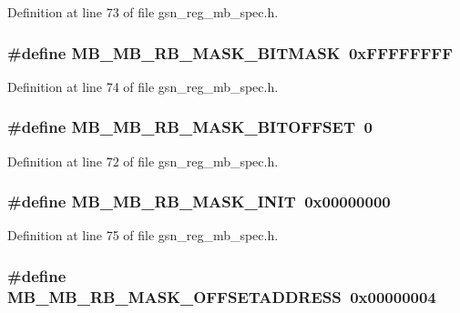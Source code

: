 Definition at line 73 of file gsn\_\-reg\_\-mb\_\-spec.h.

\hypertarget{a00562_a0c02b645113d43765676d4c2852d9c7c}{
\subsubsection[{MB\_\-MB\_\-RB\_\-MASK\_\-BITMASK}]{\setlength{\rightskip}{0pt plus 5cm}\#define MB\_\-MB\_\-RB\_\-MASK\_\-BITMASK~0xFFFFFFFF}}
\label{a00562_a0c02b645113d43765676d4c2852d9c7c}


Definition at line 74 of file gsn\_\-reg\_\-mb\_\-spec.h.

\hypertarget{a00562_adc962ec4ed6e07508c4bb1bf9e56a932}{
\subsubsection[{MB\_\-MB\_\-RB\_\-MASK\_\-BITOFFSET}]{\setlength{\rightskip}{0pt plus 5cm}\#define MB\_\-MB\_\-RB\_\-MASK\_\-BITOFFSET~0}}
\label{a00562_adc962ec4ed6e07508c4bb1bf9e56a932}


Definition at line 72 of file gsn\_\-reg\_\-mb\_\-spec.h.

\hypertarget{a00562_a5225729f954beddb3c2c5335bcfc9ec5}{
\subsubsection[{MB\_\-MB\_\-RB\_\-MASK\_\-INIT}]{\setlength{\rightskip}{0pt plus 5cm}\#define MB\_\-MB\_\-RB\_\-MASK\_\-INIT~0x00000000}}
\label{a00562_a5225729f954beddb3c2c5335bcfc9ec5}


Definition at line 75 of file gsn\_\-reg\_\-mb\_\-spec.h.

\hypertarget{a00562_ac3530909b0997f6db0c1f9ca6efb6ac5}{
\subsubsection[{MB\_\-MB\_\-RB\_\-MASK\_\-OFFSETADDRESS}]{\setlength{\rightskip}{0pt plus 5cm}\#define MB\_\-MB\_\-RB\_\-MASK\_\-OFFSETADDRESS~0x00000004}}
\label{a00562_ac3530909b0997f6db0c1f9ca6efb6ac5}


